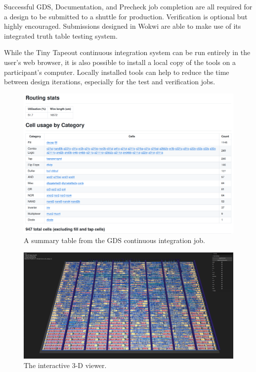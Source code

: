 Successful GDS, Documentation, and Precheck job completion are all required for a design to be submitted to a shuttle for production.
Verification is optional but highly encouraged. Submissions designed in Wokwi are able to make use of its integrated truth table testing system\cite{automatedtesting}.

While the Tiny Tapeout continuous integration system can be run entirely in the user's web browser, it is also possible to install a local copy of the tools\cite{localinstall} on a participant's computer. Locally installed tools can help to reduce the time between design iterations, especially for the test and verification jobs.

\begin{figure}[!t]
\centering
\includegraphics[width=\columnwidth]{./Figs/gh action cell stats.png}
\caption{A summary table from the GDS continuous integration job.}
\label{fig:summary_table_GDS_job}
\end{figure}

\begin{figure}[!t]
\centering
\includegraphics[width=\columnwidth]{./Figs/gh action gds 3d view.png}
\caption{The interactive 3-D viewer.}
\label{fig:interactive_3D_viewer}
\end{figure}
